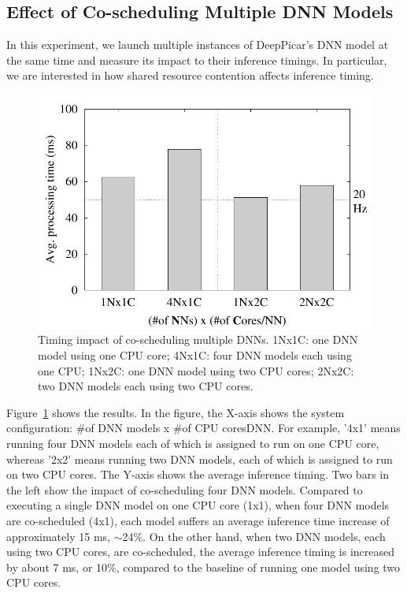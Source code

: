 \subsection{Effect of Co-scheduling Multiple DNN Models}

In this experiment, we launch multiple instances of DeepPicar's DNN
model at the same time and measure its impact to their inference
timings. In particular, we are interested in how shared resource
contention affects inference timing.


\begin{figure}[h]
  \centering
  \includegraphics[width=.45\textwidth]{figs/perf_vs_modelcnt}
  \caption{Timing impact of co-scheduling multiple DNNs. 1Nx1C: one DNN
    model using one CPU core; 4Nx1C: four DNN models each using one CPU;
    1Nx2C: one DNN model using two CPU cores; 2Nx2C: two DNN models each
    using two CPU cores.} 
  \label{fig:perf-vs-modelcnt}
\end{figure}



Figure~\ref{fig:perf-vs-modelcnt} shows the results. In the figure, the
X-axis shows the system configuration: \#of DNN models x \#of CPU
cores\/DNN. For example, '4x1' means running four DNN models each of
which is assigned to run on one CPU core, whereas '2x2' means running
two DNN models, each of which is assigned to run on two CPU
cores. The Y-axis shows the average inference timing.
Two bars in the left show the impact of co-scheduling four DNN
models. Compared to executing a single DNN model on one CPU core
(1x1), when four DNN models are co-scheduled (4x1), each model
suffers an average inference time increase of approximately 15 ms,
$\sim$24\%. On the other hand, when two DNN models, each using two CPU
cores, are co-scheduled, the average inference timing is increased by
about 7 ms, or 10\%, compared to the baseline of running one model
using two CPU cores. 

